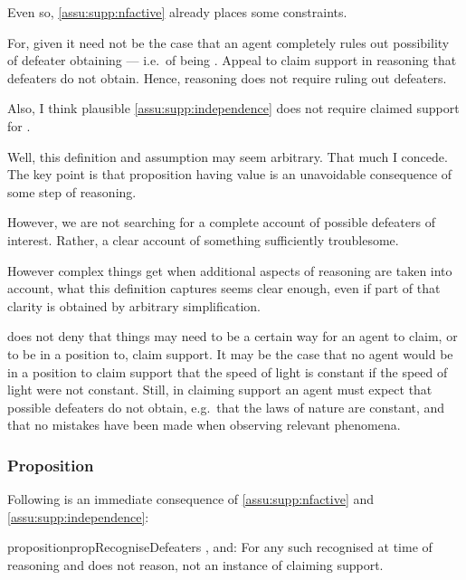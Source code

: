 \begin{note}
  Even so, \ref{assu:supp:nfactive} already places some constraints.

  For, given \nfcs{} it need not be the case that an agent completely rules out possibility of defeater obtaining --- i.e.\ of being \mom{}.
  Appeal to claim support in reasoning that defeaters do not obtain.
  Hence, reasoning does not require ruling out defeaters.

  Also, I think plausible \autoref{assu:supp:independence} does not require claimed support for .
\end{note}

\begin{note}
  Well, this definition and assumption may seem arbitrary.
  That much I concede.
  The key point is that proposition having value is an unavoidable consequence of some step of reasoning.

  However, we are not searching for a complete account of possible defeaters of interest.
  Rather, a clear account of something sufficiently troublesome.

  However complex things get when additional aspects of reasoning are taken into account, what this definition captures seems clear enough, even if part of that clarity is obtained by arbitrary simplification.
\end{note}

\begin{note}
  \eiS{} does not deny that things may need to be a certain way for an agent to claim, or to be in a position to, claim support.
  It may be the case that no agent would be in a position to claim support that the speed of light is constant if the speed of light were not constant.
  Still, in claiming support an agent must expect that possible defeaters do not obtain, e.g.\ that the laws of nature are constant, and that no mistakes have been made when observing relevant phenomena.
\end{note}

\subsubsection{Proposition}
\label{sec:proposition}

\begin{note}
  Following is an immediate consequence of \ref{assu:supp:nfactive} and \autoref{assu:supp:independence}:

  \begin{restatable}{proposition}{propRecogniseDefeaters}\label{prop:CS-only-if-reason-recognised-defeaters}
    \requ{}, and:
    For any such recognised \requ{} at time of reasoning and does not reason, not an instance of claiming support.
  \end{restatable}
\end{note}

